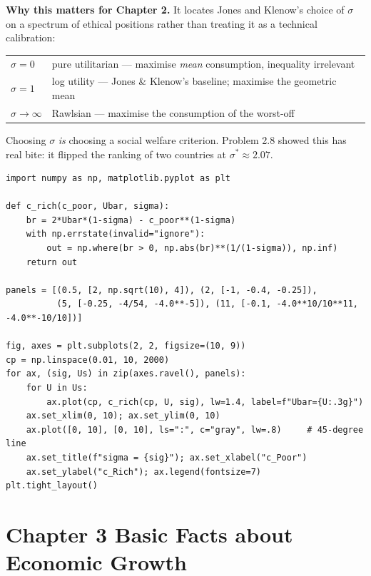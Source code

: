 \documentclass[12pt, letterpaper]{article}
\begin{document}
\begin{tcolorbox}[evenbox,title={Problem 2.10 \quad Risk Aversion and the Difference Principle}]
\begin{enumerate}
\medskip
\textbf{Why this matters for Chapter 2.} It locates Jones and Klenow's choice of
$\sigma$ on a spectrum of ethical positions rather than treating it as a technical
calibration:
\begin{center}
\begin{tabular}{ll}
\toprule
$\sigma = 0$ & pure utilitarian --- maximise \emph{mean} consumption, inequality irrelevant \\
$\sigma = 1$ & log utility --- Jones \& Klenow's baseline; maximise the geometric mean \\
$\sigma \to \infty$ & Rawlsian --- maximise the consumption of the worst-off \\
\bottomrule
\end{tabular}
\end{center}
Choosing $\sigma$ \emph{is} choosing a social welfare criterion. Problem 2.8 showed this has
real bite: it flipped the ranking of two countries at $\sigma^{\ast} \approx 2.07$.

\end{enumerate}

\begin{tcolorbox}[theorybox,title={Plotting code}]
\footnotesize
\begin{verbatim}
import numpy as np, matplotlib.pyplot as plt

def c_rich(c_poor, Ubar, sigma):
    br = 2*Ubar*(1-sigma) - c_poor**(1-sigma)
    with np.errstate(invalid="ignore"):
        out = np.where(br > 0, np.abs(br)**(1/(1-sigma)), np.inf)
    return out

panels = [(0.5, [2, np.sqrt(10), 4]), (2, [-1, -0.4, -0.25]),
          (5, [-0.25, -4/54, -4.0**-5]), (11, [-0.1, -4.0**10/10**11, -4.0**-10/10])]

fig, axes = plt.subplots(2, 2, figsize=(10, 9))
cp = np.linspace(0.01, 10, 2000)
for ax, (sig, Us) in zip(axes.ravel(), panels):
    for U in Us:
        ax.plot(cp, c_rich(cp, U, sig), lw=1.4, label=f"Ubar={U:.3g}")
    ax.set_xlim(0, 10); ax.set_ylim(0, 10)
    ax.plot([0, 10], [0, 10], ls=":", c="gray", lw=.8)     # 45-degree line
    ax.set_title(f"sigma = {sig}"); ax.set_xlabel("c_Poor")
    ax.set_ylabel("c_Rich"); ax.legend(fontsize=7)
plt.tight_layout()
\end{verbatim}
\end{tcolorbox}
\end{tcolorbox}

\section{Chapter 3 \quad Basic Facts about Economic Growth}
\end{document}

